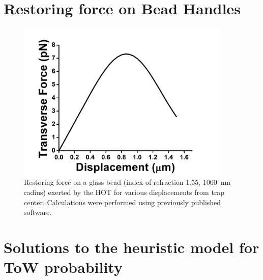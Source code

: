 \chapter{Restoring force on Bead Handles}

\begin{figure}
\centering
\includegraphics[width=4in]{appendix2/FvsL}
\caption[Restoring force on Bead Handles]{Restoring force on a glass bead (index of refraction 1.55, \SI{1000}{\nano\meter} radius) exerted by the HOT for various displacements from trap center. Calculations were performed using previously published software\cite{Nahmias2002}.}
\label{fig:BHforce}
\end{figure}

\clearpage

\chapter{Solutions to the heuristic model for ToW probability}

